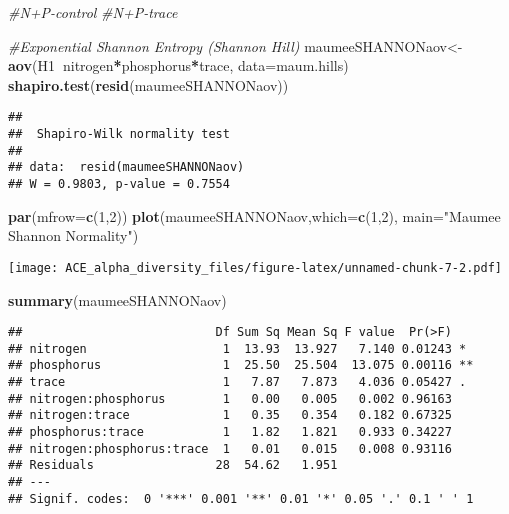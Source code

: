 \documentclass[]{article}
\newenvironment{Shaded}{\begin{snugshade}}{\end{snugshade}}
\newcommand{\KeywordTok}[1]{\textcolor[rgb]{0.13,0.29,0.53}{\textbf{#1}}}
\newcommand{\DataTypeTok}[1]{\textcolor[rgb]{0.13,0.29,0.53}{#1}}
\newcommand{\DecValTok}[1]{\textcolor[rgb]{0.00,0.00,0.81}{#1}}
\newcommand{\StringTok}[1]{\textcolor[rgb]{0.31,0.60,0.02}{#1}}
\newcommand{\CommentTok}[1]{\textcolor[rgb]{0.56,0.35,0.01}{\textit{#1}}}
\newcommand{\OperatorTok}[1]{\textcolor[rgb]{0.81,0.36,0.00}{\textbf{#1}}}
\newcommand{\NormalTok}[1]{#1}
\begin{document}
\begin{Shaded}
\begin{Highlighting}[]
\CommentTok{#N+P-control}
\CommentTok{#N+P-trace}

\CommentTok{#Exponential Shannon Entropy (Shannon Hill)}
\NormalTok{maumeeSHANNONaov<-}\KeywordTok{aov}\NormalTok{(H1}\OperatorTok{~}\NormalTok{nitrogen}\OperatorTok{*}\NormalTok{phosphorus}\OperatorTok{*}\NormalTok{trace, }\DataTypeTok{data=}\NormalTok{maum.hills)}
\KeywordTok{shapiro.test}\NormalTok{(}\KeywordTok{resid}\NormalTok{(maumeeSHANNONaov))}
\end{Highlighting}
\end{Shaded}

\begin{verbatim}
## 
##  Shapiro-Wilk normality test
## 
## data:  resid(maumeeSHANNONaov)
## W = 0.9803, p-value = 0.7554
\end{verbatim}

\begin{Shaded}
\begin{Highlighting}[]
\KeywordTok{par}\NormalTok{(}\DataTypeTok{mfrow=}\KeywordTok{c}\NormalTok{(}\DecValTok{1}\NormalTok{,}\DecValTok{2}\NormalTok{))}
\KeywordTok{plot}\NormalTok{(maumeeSHANNONaov,}\DataTypeTok{which=}\KeywordTok{c}\NormalTok{(}\DecValTok{1}\NormalTok{,}\DecValTok{2}\NormalTok{), }\DataTypeTok{main=}\StringTok{"Maumee Shannon Normality"}\NormalTok{)}
\end{Highlighting}
\end{Shaded}

\texttt{[image: ACE\_alpha\_diversity\_files/figure-latex/unnamed-chunk-7-2.pdf]}

\begin{Shaded}
\begin{Highlighting}[]
\KeywordTok{summary}\NormalTok{(maumeeSHANNONaov)}
\end{Highlighting}
\end{Shaded}

\begin{verbatim}
##                           Df Sum Sq Mean Sq F value  Pr(>F)   
## nitrogen                   1  13.93  13.927   7.140 0.01243 * 
## phosphorus                 1  25.50  25.504  13.075 0.00116 **
## trace                      1   7.87   7.873   4.036 0.05427 . 
## nitrogen:phosphorus        1   0.00   0.005   0.002 0.96163   
## nitrogen:trace             1   0.35   0.354   0.182 0.67325   
## phosphorus:trace           1   1.82   1.821   0.933 0.34227   
## nitrogen:phosphorus:trace  1   0.01   0.015   0.008 0.93116   
## Residuals                 28  54.62   1.951                   
## ---
## Signif. codes:  0 '***' 0.001 '**' 0.01 '*' 0.05 '.' 0.1 ' ' 1
\end{verbatim}
\end{document}
